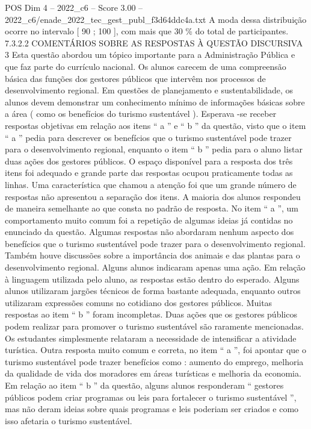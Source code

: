\begin{textsample}{POS Dim 4 – 2022\_c6 – Score 3.00 – 2022\_c6/enade\_2022\_tec\_gest\_publ\_f3d64ddc4a.txt}
A moda dessa distribuição ocorre no intervalo [ 90 ; 100 ], com mais que 30 \% do total de participantes. 7.3.2.2 COMENTÁRIOS SOBRE AS RESPOSTAS À QUESTÃO DISCURSIVA 3 Esta questão abordou um tópico importante para a Administração Pública e que faz parte do currículo nacional.
Os alunos carecem de uma compreensão básica das funções dos gestores públicos que intervêm nos processos de desenvolvimento regional.
Em questões de planejamento e sustentabilidade, os alunos devem demonstrar um conhecimento mínimo de informações básicas sobre a área ( como os benefícios do turismo sustentável ).
Esperava -se receber respostas objetivas em relação aos itens “ a ” e “ b ” da questão, visto que o item “ a ” pedia para descrever os benefícios que o turismo sustentável pode trazer para o desenvolvimento regional, enquanto o item “ b ” pedia para o aluno listar duas ações dos gestores públicos.
O espaço disponível para a resposta dos três itens foi adequado e grande parte das respostas ocupou praticamente todas as linhas.
Uma característica que chamou a atenção foi que um grande número de respostas não apresentou a separação dos itens.
A maioria dos alunos respondeu de maneira semelhante ao que consta no padrão de resposta.
No item “ a ”, um comportamento muito comum foi a repetição de algumas ideias já contidas no enunciado da questão.
Algumas respostas não abordaram nenhum aspecto dos benefícios que o turismo sustentável pode trazer para o desenvolvimento regional.
Também houve discussões sobre a importância dos animais e das plantas para o desenvolvimento regional.
Alguns alunos indicaram apenas uma ação.
Em relação à linguagem utilizada pelo aluno, as respostas estão dentro do esperado.
Alguns alunos utilizaram jargões técnicos de forma bastante adequada, enquanto outros utilizaram expressões comuns no cotidiano dos gestores públicos.
Muitas respostas ao item “ b ” foram incompletas.
Duas ações que os gestores públicos podem realizar para promover o turismo sustentável são raramente mencionadas.
Os estudantes simplesmente relataram a necessidade de intensificar a atividade turística.
Outra resposta muito comum e correta, no item “ a ”, foi apontar que o turismo sustentável pode trazer benefícios como : aumento do emprego, melhoria da qualidade de vida dos moradores em áreas turísticas e melhoria da economia.
Em relação ao item “ b ” da questão, alguns alunos responderam “ gestores públicos podem criar programas ou leis para fortalecer o turismo sustentável ”, mas não deram ideias sobre quais programas e leis poderiam ser criados e como isso afetaria o turismo sustentável.

\end{textsample}
